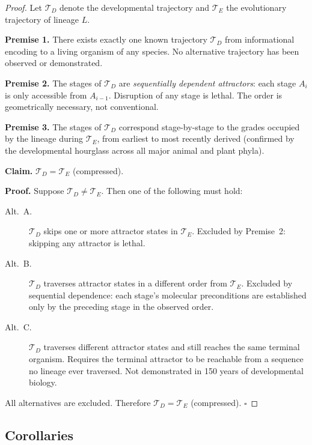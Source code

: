 \documentclass[12pt, a4paper]{article}
\theoremstyle{definition}
\theoremstyle{remark}
\begin{document}
\begin{proof}
Let $\mathcal{T}_D$ denote the developmental trajectory and
$\mathcal{T}_E$ the evolutionary trajectory of lineage $L$.

\textbf{Premise 1.} There exists exactly one known trajectory
$\mathcal{T}_D$ from informational encoding to a living
organism of any species. No alternative trajectory has been
observed or demonstrated.

\textbf{Premise 2.} The stages of $\mathcal{T}_D$ are
\emph{sequentially dependent attractors}: each stage $A_i$
is only accessible from $A_{i-1}$. Disruption of any stage
is lethal. The order is geometrically necessary, not
conventional.

\textbf{Premise 3.} The stages of $\mathcal{T}_D$ correspond
stage-by-stage to the grades occupied by the lineage during
$\mathcal{T}_E$, from earliest to most recently derived
(confirmed by the developmental hourglass across all major
animal and plant phyla).

\textbf{Claim.} $\mathcal{T}_D = \mathcal{T}_E$ (compressed).

\textbf{Proof.} Suppose $\mathcal{T}_D \neq \mathcal{T}_E$.
Then one of the following must hold:

\begin{description}
  \item[Alt.\ A.] $\mathcal{T}_D$ skips one or more attractor
    states in $\mathcal{T}_E$. Excluded by Premise~2:
    skipping any attractor is lethal.
  \item[Alt.\ B.] $\mathcal{T}_D$ traverses attractor states
    in a different order from $\mathcal{T}_E$. Excluded by
    sequential dependence: each stage's molecular preconditions
    are established only by the preceding stage in the
    observed order.
  \item[Alt.\ C.] $\mathcal{T}_D$ traverses different
    attractor states and still reaches the same terminal
    organism. Requires the terminal attractor to be reachable
    from a sequence no lineage ever traversed. Not demonstrated
    in 150 years of developmental biology.
\end{description}

All alternatives are excluded.
Therefore $\mathcal{T}_D = \mathcal{T}_E$ (compressed).
$\square$
\end{proof}

\subsection{Corollaries}
\end{document}
